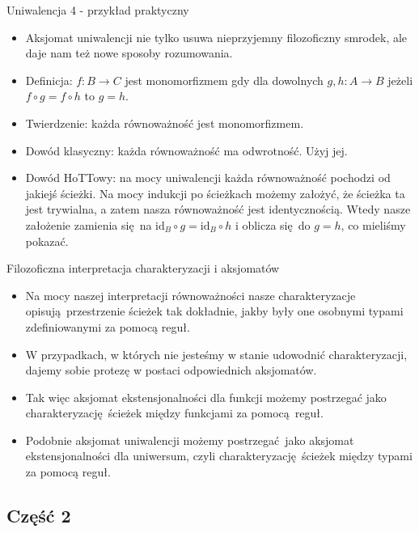 \documentclass{beamer}
\newcommand{\id}{\text{id}}
\newcommand{\comp}{\circ}
\begin{document}
\begin{frame}{Uniwalencja 4 - przykład praktyczny}
\begin{itemize}
	\item Aksjomat uniwalencji nie tylko usuwa nieprzyjemny filozoficzny smrodek, ale daje nam też nowe sposoby rozumowania.
	\item Definicja: $f : B \to C$ jest monomorfizmem gdy dla dowolnych $g, h : A \to B$ jeżeli $f \comp g = f \comp h$ to $g = h$.
	\item Twierdzenie: każda równoważność jest monomorfizmem.
	\item Dowód klasyczny: każda równoważność ma odwrotność. Użyj jej.
	\item Dowód HoTTowy: na mocy uniwalencji każda równoważność pochodzi od jakiejś ścieżki. Na mocy indukcji po ścieżkach możemy założyć, że ścieżka ta jest trywialna, a zatem nasza równoważność jest identycznością. Wtedy nasze założenie zamienia się na $\id_B \comp g = \id_B \comp h$ i oblicza się do $g = h$, co mieliśmy pokazać.
\end{itemize}
\end{frame}

\begin{frame}{Filozoficzna interpretacja charakteryzacji i aksjomatów}
\begin{itemize}
	\item Na mocy naszej interpretacji równoważności nasze charakteryzacje opisują przestrzenie ścieżek tak dokładnie, jakby były one osobnymi typami zdefiniowanymi za pomocą reguł.
	\item W przypadkach, w których nie jesteśmy w stanie udowodnić charakteryzacji, dajemy sobie protezę w postaci odpowiednich aksjomatów.
	\item Tak więc aksjomat ekstensjonalności dla funkcji możemy postrzegać jako charakteryzację ścieżek między funkcjami za pomocą reguł.
	\item Podobnie aksjomat uniwalencji możemy postrzegać jako aksjomat ekstensjonalności dla uniwersum, czyli charakteryzację ścieżek między typami za pomocą reguł.
\end{itemize}
\end{frame}

\subsection{Część 2}
\end{document}
